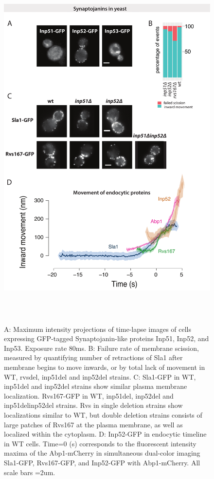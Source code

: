 			\begin{figure}
			\centering
			\includegraphics[width=19cm,height=19cm,keepaspectratio]{figures/results_final/inp}
			\caption[Synaptojanin-like proteins in yeast]
			{A: Maximum intensity projections of time-lapse images of cells expressing GFP-tagged Synaptojanin-like proteins Inp51, Inp52, and Inp53. Exposure rate 80ms.
			B: Failure rate of membrane scission, measured by quantifying number of retractions of Sla1 after membrane begins to move inwards, or by total lack of movement in WT, rvsdel, inp51del and inp52del strains.
			C: Sla1-GFP in WT, inp51del and inp52del strains show similar plasma membrane localization. Rvs167-GFP in WT, inp51del, inp52del and inp51delinp52del strains. Rvs in single deletion strains show localizations similar to WT, but double deletion strains consists of large patches of Rvs167 at the plasma membrane, as well as localized within the cytoplasm. 
			D: Inp52-GFP in endocytic timeline in WT cells. Time=0 (s) corresponds to the fluorescent intensity maxima of the Abp1-mCherry in simultaneous dual-color imaging Sla1-GFP, Rvs167-GFP, and Inp52-GFP with Abp1-mCherry. 
			All scale bars =2um.
			\label{fig_inp}}
			\end{figure}
				
